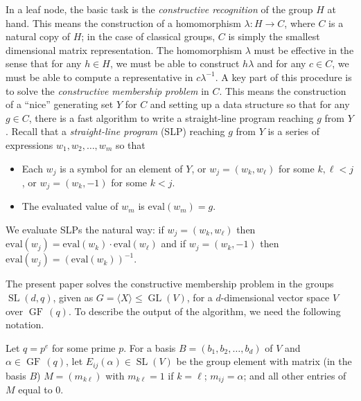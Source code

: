 \documentclass[a4paper,11pt]{article}
\def\GF{\operatorname{GF\,}}
\def\GL{\operatorname{GL}}
\def\SL{\operatorname{SL}}
\newcommand{\eval}{\mathrm{eval}}
\begin{document}
In a leaf node, the basic task is the {\em constructive recognition} of the group $H$ at hand. This means the construction of a homomorphism $\lambda: H \to C$, where $C$ is a natural copy of $H$; in the case of classical groups, $C$ is simply the smallest dimensional matrix representation. The homomorphism $\lambda$ must be effective in the sense that for any $h \in H$, we must be able to construct $h\lambda$ and for any $c \in C$, we must be able to compute a representative in $c\lambda^{-1}$. A key part of this procedure is to solve the {\em constructive membership problem} in $C$. This means the construction of a ``nice'' generating set $Y$ for $C$ and setting up a data structure so that for any $g \in C$, there is a fast algorithm to write a straight-line program reaching $g$ from $Y$. Recall that a {\em straight-line program} (SLP) reaching $g$ from $Y$ is a series of expressions $w_1,w_2,\ldots,w_m$ so that 
\begin{itemize}
\item Each $w_j$ is a symbol for an element of $Y$, or $w_j=(w_k,w_{\ell})$ for some $k,\ell <j$, or $w_j=(w_k,-1)$ for some $k<j$.
\item The evaluated value of $w_m$ is $\eval(w_m)=g$.
\end{itemize}
We evaluate SLPs the natural way: if $w_j=(w_k,w_{\ell})$ then $\eval(w_j)=\eval(w_k) \cdot \eval(w_{\ell})$ and if $w_j=(w_k,-1)$ then $\eval(w_j)=(\eval(w_k))^{-1}$. 

The present paper solves the constructive membership problem in the groups $\SL(d,q)$, given as $G = \langle X \rangle \le \GL(V)$, for a $d$-dimensional vector space $V$ over $\GF(q)$. To describe the output of the algorithm, we need the following notation. 

Let $q=p^e$ for some prime $p$. For a basis $B=(b_1,b_2,\ldots,b_d)$ of $V$ and $\alpha \in \GF(q)$, let $E_{ij}(\alpha) \in \SL(V)$ be the group element with matrix (in the basis $B$) $M=(m_{k\ell})$ with $m_{k\ell}=1$ if $k=\ell$; 
$m_{ij}=\alpha$; and all other entries of $M$ equal to $0$. 
\end{document}
